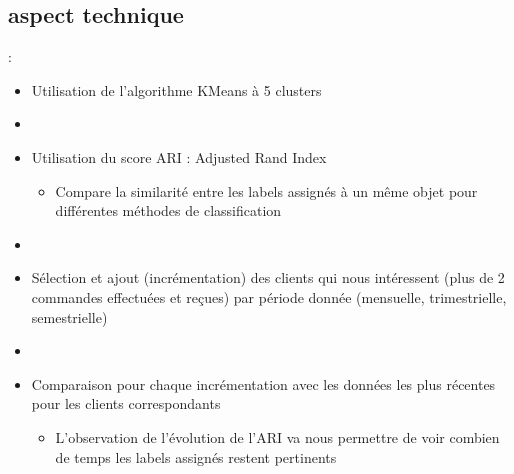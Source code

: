 \documentclass[8pt,aspectratio=169,hyperref={unicode=true}]{beamer}
\begin{document}
\subsection{aspect technique}
\begin{frame}{\insertsection: \insertsubsection}
    \begin{itemize}
        \item Utilisation de l'algorithme KMeans à 5 clusters
        \item[]
        \item Utilisation du score ARI : Adjusted Rand Index
              \begin{itemize}
                  \item Compare la similarité entre les labels assignés à un même objet pour différentes méthodes de classification
              \end{itemize}
        \item[]
        \item Sélection et ajout (incrémentation) des clients qui nous intéressent (plus de 2 commandes effectuées et reçues) par période donnée (mensuelle, trimestrielle, semestrielle)
        \item[]
        \item Comparaison pour chaque incrémentation avec les données les plus récentes pour les clients correspondants
              \begin{itemize}
                  \item L'observation de l'évolution de l'ARI va nous permettre de voir combien de temps les labels assignés restent pertinents
              \end{itemize}
    \end{itemize}
\end{frame}
\end{document}
